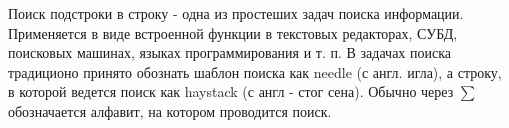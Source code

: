 \documentclass[../main.tex]{subfiles}
\begin{document}
	
	Поиск подстроки в строку - одна из простеших задач поиска информации.
	Применяется в виде встроенной функции в текстовых редакторах, СУБД, поисковых машинах, языках программирования и т. п.
	В задачах поиска традиционо принято обознать шаблон поиска как needle (с англ. игла), а строку, в которой ведется поиск как haystack (с англ - стог сена). Обычно через $\sum$ обозначается алфавит, на котором проводится поиск.
	
\end{document}
